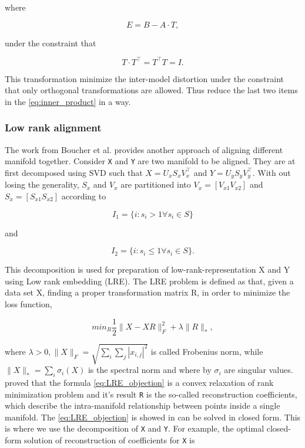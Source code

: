   where 
  
  \begin{equation}
    E=B-A\cdot T,
  \end{equation}
    
    under the constraint that 
  
  \begin{equation}
    T\cdot T^\intercal=T^\intercal T=I.
  \end{equation}
  
  This transformation minimize the inter-model distortion under the constraint that only orthogonal transformations are allowed. Thus reduce the last two items in the \eqref{eq:inner_product} in a way.

  \subsubsection{Low rank alignment}
  The work from Boucher et al. \cite{boucher2015aligning} provides another approach of aligning different manifold together. Consider \verb|X| and \verb|Y| are two manifold to be aligned. They are at first decomposed using SVD such that $X=U_xS_xV_x^\intercal$ and $Y=U_yS_yV_y^\intercal$. With out losing the generality, $S_x$ and $V_x$ are partitioned into $V_x=[V_{x1}V_{x2}]$ and $S_x=[S_{x1}S_{x2}]$ according to 

  \begin{equation}
    I_1=\{i:s_i>1 \forall s_i \in S\}
  \end{equation}

  and
  
  \begin{equation}
    I_2=\{i:s_i\leq 1 \forall s_i\in S\}.
  \end{equation} 

  This decomposition is used for preparation of low-rank-representation X and Y using Low rank embedding (LRE). The LRE problem is defined as that, given a data set X, finding a proper transformation matrix R, in order to minimize the loss function,

  \begin{equation}\label{eq:LRE_objection}
    min_R\frac{1}{2}\|X-XR\|^2_F+\lambda\|R\|_*,
  \end{equation}

  where $\lambda > 0, \|X\|_F=\sqrt{\sum_i\sum_j|x_{i,j}|^2}$ is called Frobenius norm, while $\|X\|_*=\sum_i\sigma_i(X)$ is the spectral norm and where by $\sigma_i$ are singular values. \cite{candes2010power} proved that the formula \eqref{eq:LRE_objection} is a convex relaxation of rank minimization problem and it's result \verb|R| is the so-called reconstruction coefficients, which describe the intra-manifold relationship between points inside a single manifold. The \eqref{eq:LRE_objection} is showed in \cite{favaro2011closed} can be solved in closed form. This is where we use the decomposition of \verb|X| and \verb|Y|. For example, the optimal closed-form solution of reconstruction of coefficients for \verb|X| is
  
